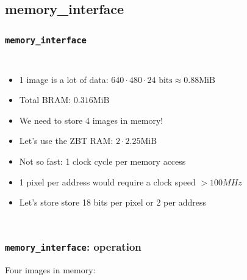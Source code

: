\documentclass{beamer}
\begin{document}
\subsection{memory\_interface}
\begin{frame}
	\frametitle{{\tt memory\_interface}}
	\begin{columns}[t]
		\begin{itemize}
		\item<1-> 1 image is a lot of data: \( 640\cdot480\cdot24 \text{ bits} \approx 0.88 \text{MiB} \)
		\item<2-> Total BRAM: \( 0.316 \text{MiB} \)
		\item<3-> We need to store 4 images in memory!
		\item<4-> Let's use the ZBT RAM: \( 2\cdot2.25 \text{MiB} \)
		\item<5-> Not so fast: 1 clock cycle per memory access
		\item<6-> 1 pixel per address would require a clock speed \( > 100MHz \)
		\item<7-> Let's store store 18 bits per pixel or 2 per address
		\end{itemize}

	\end{columns}
\end{frame}

\begin{frame}
	\frametitle{{\tt memory\_interface}: operation}
	\begin{center}
		Four images in memory:
	\end{center}
	\begin{figure}
		\centering
	\end{figure}
	\begin{center}
	\end{center}
\end{frame}
\end{document}
